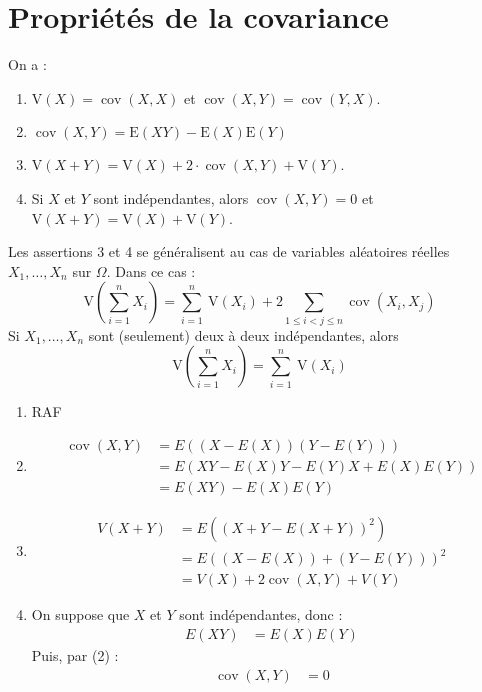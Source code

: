 \documentclass[../main.tex]{subfiles}
\begin{document}
\section{Propriétés de la covariance}
\begin{tcolorbox}[title=Propostion 33.15, title filled=false, colframe=lightblue, colback=lightblue!10!white]
    On a :
    \begin{enumerate}
        \item $\mathrm{V}(X)=\operatorname{cov}(X, X)$ et $\operatorname{cov}(X, Y)=\operatorname{cov}(Y, X)$.
        \item $\operatorname{cov}(X, Y)=\mathrm{E}(X Y)-\mathrm{E}(X) \mathrm{E}(Y)$
        \item $\mathrm{V}(X+Y)=\mathrm{V}(X)+2 \cdot \operatorname{cov}(X, Y)+\mathrm{V}(Y)$.
        \item Si $X$ et $Y$ sont indépendantes, alors $\operatorname{cov}(X, Y)=0$ et $\mathrm{V}(X+Y)=\mathrm{V}(X)+\mathrm{V}(Y)$.
    \end{enumerate}
    Les assertions 3 et 4 se généralisent au cas de variables aléatoires réelles $X_1, \ldots, X_n$ sur $\Omega$. Dans ce cas :
    $$\mathrm{V}\left(\sum_{i=1}^n X_i\right)=\sum_{i=1}^n \mathrm{~V}\left(X_i\right)+2 \sum_{1 \leq i<j \leq n} \operatorname{cov}\left(X_i, X_j\right)$$
    Si $X_1, \ldots, X_n$ sont (seulement) deux à deux indépendantes, alors
    $$\mathrm{V}\left(\sum_{i=1}^n X_i\right)=\sum_{i=1}^n \mathrm{~V}\left(X_i\right)$$
\end{tcolorbox}

\begin{enumerate}
    \item RAF
    \item \begin{align*}
        \operatorname{cov}(X, Y) &= E((X - E(X))(Y - E(Y))) \\
        &= E(XY - E(X)Y - E(Y)X + E(X) E(Y)) \\
        &= E(XY) - E(X)E(Y)
    \end{align*}
    \item \begin{align*}
        V(X+Y) &= E((X + Y - E(X + Y))^2) \\
        &= E((X - E(X)) + (Y - E(Y)))^2 \\
        &= V(X) + 2 \operatorname{cov}(X, Y) + V(Y)
    \end{align*}
    \item On suppose que $X$ et $Y$ sont indépendantes, donc :
    \begin{align*}
        E(XY) &= E(X)E(Y)
    \end{align*}
    Puis, par (2) :
    \begin{align*}
        \operatorname{cov}(X, Y) &= 0
    \end{align*}
\end{enumerate}
\end{document}
